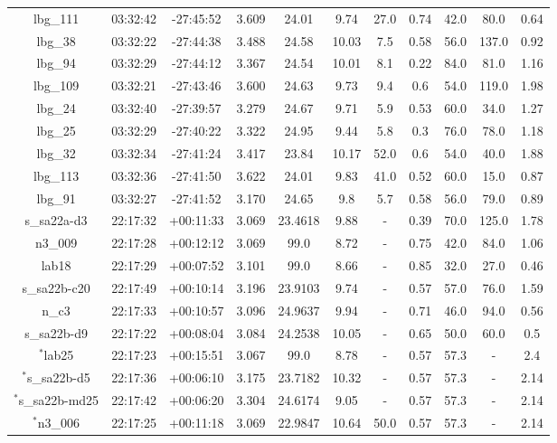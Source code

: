 \documentclass[fleqn,usenatbib]{mn2e}
\begin{document}
\begin{table*}
\begin{threeparttable}
\begin{tabular}{ccccccccccc}
lbg\_111        & 03:32:42 & -27:45:52 & 3.609       & 24.01  & 9.74  & 27.0 & 0.74        & 42.0        & 80.0    & 0.64      \\
lbg\_38         & 03:32:22 & -27:44:38 & 3.488       & 24.58  & 10.03 & 7.5  & 0.58        & 56.0        & 137.0   & 0.92      \\
lbg\_94         & 03:32:29 & -27:44:12 & 3.367       & 24.54  & 10.01 & 8.1  & 0.22        & 84.0        & 81.0    & 1.16      \\
lbg\_109        & 03:32:21 & -27:43:46 & 3.600       & 24.63  & 9.73  & 9.4  & 0.6         & 54.0        & 119.0   & 1.98      \\
lbg\_24         & 03:32:40 & -27:39:57 & 3.279       & 24.67  & 9.71  & 5.9  & 0.53        & 60.0        & 34.0    & 1.27      \\
lbg\_25         & 03:32:29 & -27:40:22 & 3.322        & 24.95  & 9.44  & 5.8  & 0.3         & 76.0        & 78.0    & 1.18      \\
lbg\_32         & 03:32:34 & -27:41:24 & 3.417      & 23.84  & 10.17 & 52.0 & 0.6         & 54.0        & 40.0    & 1.88      \\
lbg\_113        & 03:32:36 & -27:41:50 & 3.622      & 24.01  & 9.83  & 41.0 & 0.52        & 60.0        & 15.0    & 0.87      \\
lbg\_91         & 03:32:27 & -27:41:52 & 3.170       & 24.65  & 9.8   & 5.7  & 0.58        & 56.0        & 79.0    & 0.89 \\
s\_sa22a-d3   & 22:17:32 & +00:11:33 & 3.069 & 23.4618 & 9.88  & -            & 0.39        & 70.0        & 125.0   & 1.78      \\
n3\_009       & 22:17:28 & +00:12:12 & 3.069 & 99.0    & 8.72  & -            & 0.75        & 42.0        & 84.0    & 1.06      \\
lab18         & 22:17:29 & +00:07:52 & 3.101           & 99.0    & 8.66  & -            & 0.85        & 32.0        & 27.0    & 0.46      \\
s\_sa22b-c20  & 22:17:49 & +00:10:14 & 3.196     & 23.9103 & 9.74  & -            & 0.57        & 57.0        & 76.0    & 1.59      \\
n\_c3         & 22:17:33 & +00:10:57 & 3.096       & 24.9637 & 9.94  & -            & 0.71        & 46.0        & 94.0    & 0.56      \\
s\_sa22b-d9   & 22:17:22 & +00:08:04 & 3.084    & 24.2538 & 10.05 & -            & 0.65        & 50.0        & 60.0    & 0.5       \\
$^{*}$lab25         & 22:17:23 & +00:15:51 & 3.067      & 99.0    & 8.78  & -            & 0.57         & 57.3        & -    & 2.4      \\
$^{*}$s\_sa22b-d5  & 22:17:36 & +00:06:10 & 3.175 & 23.7182 & 10.32 & -            & 0.57         & 57.3        & -    & 2.14      \\
$^{*}$s\_sa22b-md25 & 22:17:42 & +00:06:20 & 3.304     & 24.6174 & 9.05  & -            & 0.57         & 57.3        & -    & 2.14      \\
$^{*}$n3\_006       & 22:17:25 & +00:11:18 & 3.069     & 22.9847 & 10.64 & 50.0 & 0.57         & 57.3        & -    & 2.14      


\end{tabular}
\end{threeparttable}
\end{table*}
\end{document}
